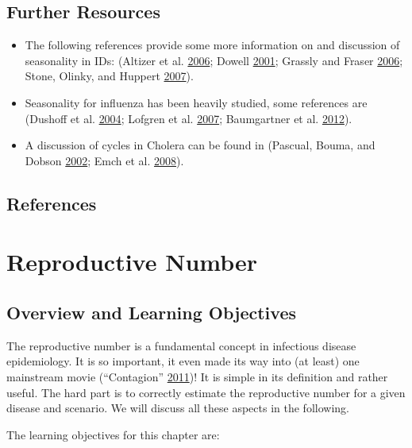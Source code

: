 \documentclass[]{book}
\providecommand{\tightlist}{%
  \setlength{\itemsep}{0pt}\setlength{\parskip}{0pt}}
\theoremstyle{definition}
\theoremstyle{definition}
\theoremstyle{definition}
\theoremstyle{remark}
\begin{document}
\section{Further Resources}\label{further-resources-2}

\begin{itemize}
\tightlist
\item
  The following references provide some more information on and
  discussion of seasonality in IDs: (Altizer et al.
  \protect\hyperlink{ref-altizer06}{2006}; Dowell
  \protect\hyperlink{ref-dowell01}{2001}; Grassly and Fraser
  \protect\hyperlink{ref-grassly06}{2006}; Stone, Olinky, and Huppert
  \protect\hyperlink{ref-stone07}{2007}).
\item
  Seasonality for influenza has been heavily studied, some references
  are (Dushoff et al. \protect\hyperlink{ref-dushoff04}{2004}; Lofgren
  et al. \protect\hyperlink{ref-lofgren07}{2007}; Baumgartner et al.
  \protect\hyperlink{ref-baumgartner12}{2012}).
\item
  A discussion of cycles in Cholera can be found in (Pascual, Bouma, and
  Dobson \protect\hyperlink{ref-pascual02}{2002}; Emch et al.
  \protect\hyperlink{ref-emch08}{2008}).
\end{itemize}

\section{References}\label{references-3}

\chapter{Reproductive Number}\label{reproductive-number}

\section{Overview and Learning
Objectives}\label{overview-and-learning-objectives-3}

The reproductive number is a fundamental concept in infectious disease
epidemiology. It is so important, it even made its way into (at least)
one mainstream movie (``Contagion''
\protect\hyperlink{ref-contagionmovie}{2011})! It is simple in its
definition and rather useful. The hard part is to correctly estimate the
reproductive number for a given disease and scenario. We will discuss
all these aspects in the following.

The learning objectives for this chapter are:
\end{document}
